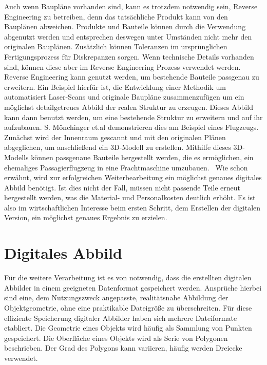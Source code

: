 Auch wenn Baupläne vorhanden sind, kann es trotzdem notwendig sein, 
Reverse Engineering zu betreiben, denn das tatsächliche Produkt kann von
den Bauplänen abweichen. Produkte und Bauteile können durch die Verwendung 
abgenutzt werden und entsprechen deswegen unter Umständen nicht mehr den originalen 
Bauplänen. Zusätzlich können Toleranzen im ursprünglichen Fertigungsprozess 
für Diskrepanzen sorgen. Wenn technische Details vorhanden sind,
können diese aber im Reverse Engineering Prozess verwendet werden. 
Reverse Engineering kann genutzt werden, um 
bestehende Bauteile passgenau zu erweitern. Ein Beispiel hierfür ist, die
Entwicklung einer Methodik um automatisiert Laser-Scans und originale Baupläne
zusammenzufügen um ein möglichst detailgetreues Abbild der realen Struktur zu
erzeugen. Dieses Abbild kann dann benutzt werden, um eine bestehende Struktur zu 
erweitern und auf ihr aufzubauen. S. Mönchinger et.al demonstrieren dies am Beispiel eines 
Flugzeugs. Zunächst wird der Innenraum gescannt und mit den originalen Plänen abgeglichen, 
um anschließend ein 3D-Modell zu erstellen. Mithilfe dieses 3D-Modells können passgenaue 
Bauteile hergestellt werden, die es ermöglichen, ein ehemaliges Passagierflugzeug in eine 
Frachtmaschine umzubauen.~\cite{Monchinger.2021}
Wie schon erwähnt, wird zur erfolgreichen Weiterbearbeitung ein möglichst 
genaues digitales Abbild benötigt.
Ist dies nicht der Fall, müssen nicht passende Teile erneut hergestellt werden, 
was die Material- und Personalkosten deutlich erhöht. Es ist also im 
wirtschaftlichen Interesse beim ersten Schritt, dem Erstellen der digitalen 
Version, ein möglichst genaues Ergebnis zu erzielen. 

\section{Digitales Abbild}

Für die weitere Verarbeitung ist es von notwendig, dass die erstellten digitalen 
Abbilder in einem geeigneten Datenformat gespeichert werden. Ansprüche hierbei sind 
eine, dem Nutzungszweck angepasste, realitätsnahe Abbildung der Objektgeometrie, 
ohne eine praktikable Dateigröße zu überschreiten.
Für diese effiziente Speicherung digitaler Abbilder haben sich mehrere
Dateiformate etabliert.
Die Geometrie eines Objekts wird häufig als Sammlung von Punkten 
gespeichert. Die Oberfläche eines Objekts wird als Serie von Polygonen beschrieben. 
Der Grad des Polygons kann variieren, häufig werden Dreiecke verwendet. \cite{lee2019study}

